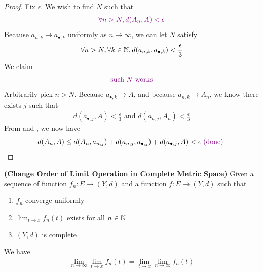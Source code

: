 \documentclass{report}
\begin{document}
\begin{proof}
Fix $\epsilon $. We wish to find $N$ such that 
 \begin{align*}
   \textcolor{violet}{\forall n>N, d(A_n,A)<\epsilon}
\end{align*}
Because  $a_{n,k}\to a_{\bullet,k}$ uniformly as $n \to \infty$, we can let $N$ satisfy 
\begin{align}
\label{K3}
\forall n>N,\forall k\in\mathbb{N}, d(a_{n,k},a_{\bullet,k})<\frac{\epsilon}{3}
\end{align}
We claim 
\begin{align*}
\textcolor{violet}{\text{ such $N$ works }}
\end{align*}
Arbitrarily pick $n>N$. Because $a_{\bullet,k} \to A$, and because $a_{n,k} \to A_n$, we know there exists $j$ such that 
 \begin{align}
  \label{K4}
d(a_{\bullet,j},A)<\frac{\epsilon}{3}\text{ and }d(a_{n,j},A_n)<\frac{\epsilon}{3}
\end{align}
From  and , we now have
\begin{align*}
d(A_n,A)\leq d(A_n,a_{n,j})+d(a_{n,j},a_{\bullet,j})+d(a_{\bullet,j},A)<\epsilon \textcolor{violet}{\text{ (done) }}
\end{align*}
\end{proof}
\begin{corollary}
\label{COiC}
\textbf{(Change Order of Limit Operation in Complete Metric Space)} Given a sequence of function $f_n:E\rightarrow (Y,d)$ and a function $f:E\rightarrow (Y,d)$ such that 
\begin{enumerate}[label=(\alph*)]
  \item $f_n$ converge uniformly
   \item $\lim_{t\to x}f_n(t)$ exists for all $n \in\mathbb{N}$
    \item $(Y,d)$ is complete
\end{enumerate}
We have
\begin{align*}
\lim_{n\to \infty }\lim_{t\to x}f_n(t)=\lim_{t\to x}\lim_{n\to \infty}f_n(t)
\end{align*}
\end{corollary}
\end{document}
